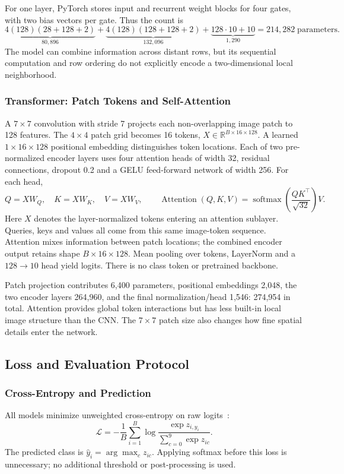 For one layer, PyTorch stores input and recurrent weight blocks for four gates, with two bias vectors per gate. Thus the count is
\begin{equation}
\underbrace{4(128)(28+128+2)}_{80{,}896}
+\underbrace{4(128)(128+128+2)}_{132{,}096}
+\underbrace{128\cdot10+10}_{1{,}290}=214{,}282\;\text{parameters}.
\end{equation}
The model can combine information across distant rows, but its sequential computation and row ordering do not explicitly encode a two-dimensional local neighborhood.

\subsubsection{Transformer: Patch Tokens and Self-Attention}
A $7\times7$ convolution with stride 7 projects each non-overlapping image patch to 128 features. The $4\times4$ patch grid becomes 16 tokens, $X\in\mathbb R^{B\times16\times128}$. A learned $1\times16\times128$ positional embedding distinguishes token locations. Each of two pre-normalized encoder layers uses four attention heads of width 32, residual connections, dropout 0.2 and a GELU feed-forward network of width 256. For each head,
\begin{equation}
Q=XW_Q,\quad K=XW_K,\quad V=XW_V,\qquad
\operatorname{Attention}(Q,K,V)=\operatorname{softmax}\!\left(\frac{QK^\top}{\sqrt{32}}\right)V.
\end{equation}
Here $X$ denotes the layer-normalized tokens entering an attention sublayer. Queries, keys and values all come from this same image-token sequence. Attention mixes information between patch locations; the combined encoder output retains shape $B\times16\times128$. Mean pooling over tokens, LayerNorm and a $128\to10$ head yield logits. There is no class token or pretrained backbone.

Patch projection contributes 6,400 parameters, positional embeddings 2,048, the two encoder layers 264,960, and the final normalization/head 1,546: 274,954 in total. Attention provides global token interactions but has less built-in local image structure than the CNN. The $7\times7$ patch size also changes how fine spatial details enter the network.

\subsection{Loss and Evaluation Protocol}
\subsubsection{Cross-Entropy and Prediction}
All models minimize unweighted cross-entropy on raw logits~\cite{pytorchloss}:
\begin{equation}
\mathcal L=-\frac1B\sum_{i=1}^{B}\log\frac{\exp z_{i,y_i}}{\sum_{c=0}^{9}\exp z_{ic}}.
\end{equation}
The predicted class is $\hat y_i=\arg\max_c z_{ic}$. Applying softmax before this loss is unnecessary; no additional threshold or post-processing is used.


